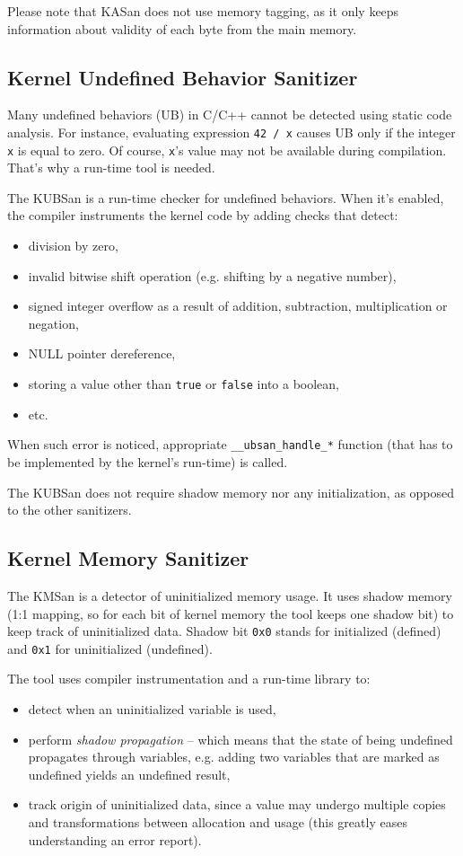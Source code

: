 \documentclass[shortabstract, manyadvisors, english, mgr]{iithesis}
\theoremstyle{definition} \newtheorem*{definition}{Definicja}
\theoremstyle{definition} \newtheorem*{example}{Przykład}
\theoremstyle{definition} \newtheorem*{remark}{Uwaga}
\begin{document}
Please note that KASan does not use memory tagging, as it only keeps information about validity of each byte from the main memory.

\subsection{Kernel Undefined Behavior Sanitizer}
Many undefined behaviors (UB) in C/C++ cannot be detected using static code analysis. For instance, evaluating expression \texttt{42 / x} causes UB only if the integer \texttt{x} is equal to zero. Of course, \texttt{x}'s value may not be available during compilation. That's why a run-time tool is needed.

The KUBSan \cite{bib:kubsan-openbsd} is a run-time checker for undefined behaviors. When it's enabled, the compiler instruments the kernel code by adding checks that detect:
\begin{itemize}
    \item division by zero,
    \item invalid bitwise shift operation (e.g. shifting by a negative number),
    \item signed integer overflow as a result of addition, subtraction, multiplication or negation,
    \item NULL pointer dereference,
    \item storing a value other than \texttt{true} or \texttt{false} into a boolean,
    \item etc.
\end{itemize}

When such error is noticed, appropriate \texttt{\_\_ubsan\_handle\_*} function (that has to be implemented by the kernel's run-time) is called.

The KUBSan does not require shadow memory nor any initialization, as opposed to the other sanitizers.

\subsection{Kernel Memory Sanitizer}
The KMSan \cite{bib:msan-paper} \cite{bib:kmsan-github} is a detector of uninitialized memory usage. It uses shadow memory (1:1 mapping, so for each bit of kernel memory the tool keeps one shadow bit) to keep track of uninitialized data. Shadow bit \texttt{0x0} stands for initialized (defined) and \texttt{0x1} for uninitialized (undefined).

The tool uses compiler instrumentation and a run-time library to:
\begin{itemize}
    \item detect when an uninitialized variable is used,
    \item perform \textit{shadow propagation} -- which means that the state of being undefined propagates through variables, e.g. adding two variables that are marked as undefined yields an undefined result,
    \item track origin of uninitialized data, since a value may undergo multiple copies and transformations between allocation and usage (this greatly eases understanding an error report).
\end{itemize}
\end{document}
